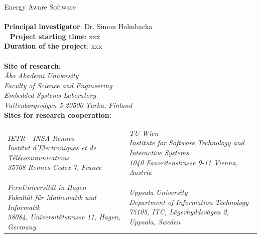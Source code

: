 \documentclass{article}
\begin{document}
\huge{Energy Aware Software}\\\\
\normalsize\textbf{Principal investigator}: Dr. Simon Holmbacka\\ 
\textbf{Project starting time}: xxx\\
\textbf{Duration of the project}: xxx\\\\
\textbf{Site of research}:\\
\textit{\AA{}bo Akademi University} \\
\textit{Faculty of Science and Engineering}\\
\textit{Embedded Systems Laboratory}\\
\textit{Vattenborgsv\"{a}gen 5 20500 Turku, Finland}\\

\textbf{Sites for research cooperation:}\\





\begin{table}[h]
\begin{center}

\begin{tabular}{  l  l  }
\pbox{10cm}{\textit {IETR - INSA Rennes}\\\textit {Institut d'Electroniques et de T\'{e}l\'{e}communications}\\\textit{35708 Rennes Cedex 7, France}} & 
\pbox{10cm}{\textit {TU Wien}\\ \textit{Institute for Software Technology and Interactive Systems}\\\textit{1040 Favoritenstrasse 9-11 Vienna, Austria}}   \\ \\
\pbox{10cm}{\textit{FernUniversit\"{a}t in Hagen}\\ \textit{Fakult\"{a}t f\"{u}r Mathematik und Informatik}\\ \textit{58084, Universit\"{a}tstrasse 11, Hagen, Germany}} & 
\pbox{10cm}{\textit{Uppsala University}\\\textit{Department of Information Technology}\\\textit{75105, ITC, L\"{a}gerhyddsv\"{a}gen 2, Uppsala, Sweden}} \\ 
\end{tabular}
\label{tab:strconf}
\end{center}

\end{table}
\end{document}

